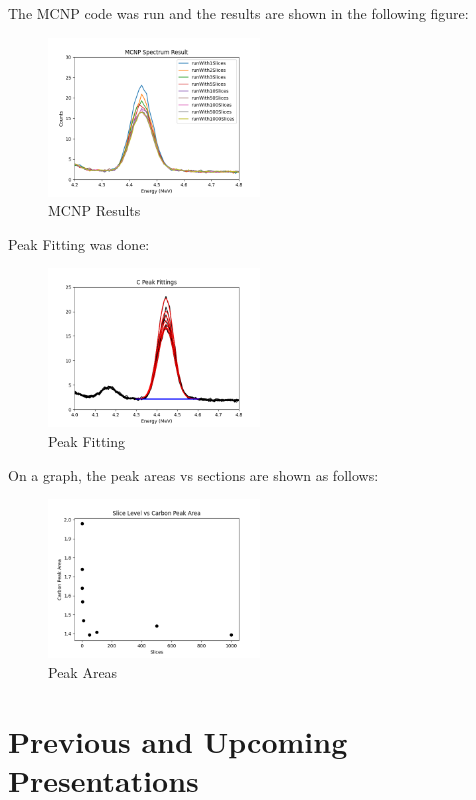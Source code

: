 \documentclass{article}
\begin{document}
The MCNP code was run and the results are shown in the following figure:

\begin{figure}[h]
    \centering
    \includegraphics[width=0.5\textwidth]{imgs/mcnp_results.png}
    \caption{MCNP Results}
\end{figure}

Peak Fitting was done:

\begin{figure}[h]
    \centering
    \includegraphics[width=0.5\textwidth]{imgs/peak_fitting.png}
    \caption{Peak Fitting}
\end{figure}

On a graph, the peak areas vs sections are shown as follows:

\begin{figure}[h]
    \centering
    \includegraphics[width=0.5\textwidth]{imgs/peak_areas.png}
    \caption{Peak Areas}
\end{figure}

\section{Previous and Upcoming Presentations}
\end{document}
